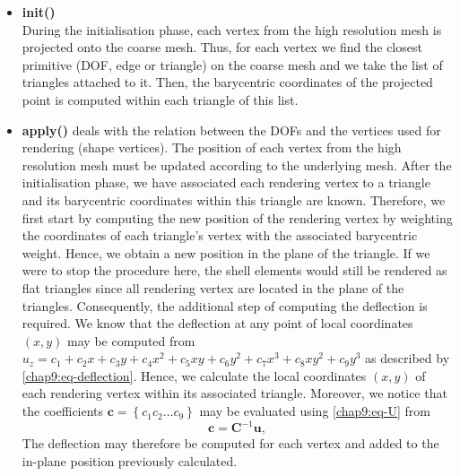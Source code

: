 \begin{itemize}
\item \textbf{init()} \\
During the initialisation phase, each vertex from the high resolution mesh is projected onto the coarse mesh. Thus, for each vertex we find the closest primitive (DOF, edge or triangle) on the coarse mesh and we take the list of triangles attached to it. Then, the barycentric coordinates of the projected point is computed within each triangle of this list.
%
\item \textbf{apply()} deals with the relation between the DOFs and the vertices used for rendering (shape vertices). The position of each vertex from the high resolution mesh must be updated according to the underlying mesh. After the initialisation phase, we have associated each rendering vertex to a triangle and its barycentric coordinates within this triangle are known. Therefore, we first start by computing the new position of the rendering vertex by weighting the coordinates of each triangle's vertex with the associated barycentric weight. Hence, we obtain a new position in the plane of the triangle. If we were to stop the procedure here, the shell elements would still be rendered as flat triangles since all rendering vertex are located in the plane of the triangles. Consequently, the additional step of computing the deflection is required. We know that the deflection at any point of local coordinates $(x, y)$ may be computed from $u_z = c_1 + c_2x + c_3y + c_4x^2 + c_5xy + c_6y^2 + c_7x^3 + c_8xy^2 + c_9y^3$ as described by \eqref{chap9:eq-deflection}. Hence, we calculate the local coordinates $(x, y)$ of each rendering vertex within its associated triangle. Moreover, we notice that the coefficients $ \mathbf{c} = \left\{c_1 c_2 \ldots c_9 \right\} $ may be evaluated using \eqref{chap9:eq-U} from
\begin{equation}
\mathbf{c} = \mathbf{C}^{-1} \mathbf{u},
\end{equation}
The deflection may therefore be computed for each vertex and added to the in-plane position previously calculated. 
\end{itemize}

